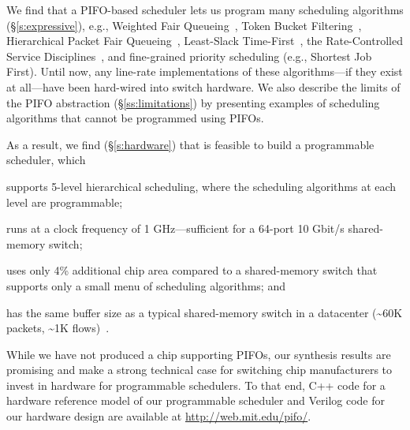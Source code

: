We find that a PIFO-based scheduler lets us program many scheduling
algorithms (\S\ref{s:expressive}), e.g., Weighted Fair
Queueing~\cite{wfq}, Token Bucket Filtering~\cite{tbf}, Hierarchical
Packet Fair Queueing~\cite{hpfq}, Least-Slack Time-First~\cite{lstf}, the Rate-Controlled
Service Disciplines~\cite{rcsd}, and fine-grained priority scheduling
(e.g., Shortest Job First). Until now, any line-rate implementations
of these algorithms---if they exist at all---have been hard-wired into
switch hardware. We also describe the limits of the PIFO abstraction
(\S\ref{ss:limitations}) by presenting examples of scheduling
algorithms that cannot be programmed using PIFOs.


As a result, we find (\S\ref{s:hardware}) that is feasible to build a programmable scheduler, which
\begin{CompactItemize}
  \item supports 5-level hierarchical scheduling, where the scheduling
    algorithms at each level are programmable;
  \item runs at a clock frequency of 1 GHz---sufficient for a 64-port
    10 Gbit/s shared-memory switch;
  \item uses only 4\% additional chip area compared to a
    shared-memory switch that supports only a small menu of scheduling
    algorithms; and
  \item has the same buffer size as a typical shared-memory switch
    in a datacenter (\textasciitilde 60K packets, \textasciitilde 1K flows)~\cite{trident2}.
\end{CompactItemize}

While we have not produced a chip supporting PIFOs, our synthesis results
are promising and make a strong technical case for switching chip manufacturers to invest
in hardware for programmable schedulers. To that end, C++ code for a
hardware reference model of our programmable scheduler and Verilog
code for our hardware design are available at \url{http://web.mit.edu/pifo/}.
